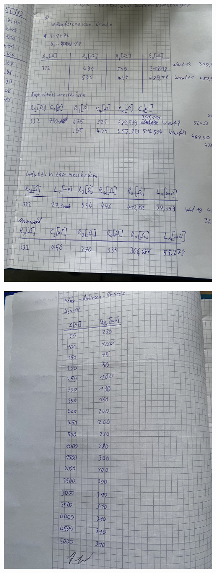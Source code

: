   \begin{figure}
    \centering
    \includegraphics{Bilder/mess1.jpg}
    
    \label{fig:mess1}
  \end{figure}
  \begin{figure}
    \centering
    \includegraphics{Bilder/mess2.jpg}
  
    \label{fig:mess2}
  \end{figure}